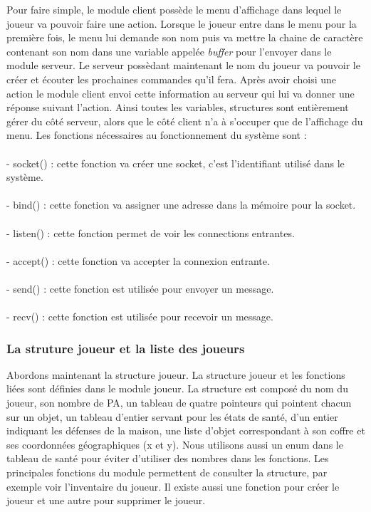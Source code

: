 \documentclass[a4paper,11pt]{article}
\begin{document}
Pour faire simple, le module client possède le menu d'affichage dans lequel le joueur va pouvoir faire une action. Lorsque le joueur entre dans le menu pour la première fois, le menu lui demande son nom puis va mettre la chaine de caractère contenant son nom dans une variable appelée \textit{buffer} pour l'envoyer dans le module serveur. Le serveur possèdant maintenant le nom du joueur va pouvoir le créer et écouter les prochaines commandes qu'il fera. Après avoir choisi une action le module client envoi cette information au serveur qui lui va donner une réponse suivant l'action. Ainsi toutes les variables, structures sont entièrement gérer du côté serveur, alors que le côté client n'a à s'occuper que de l'affichage du menu. Les fonctions nécessaires au fonctionnement du système sont :
\\
\\
- socket() : cette fonction va créer une socket, c'est l'identifiant utilisé dans le système.
\\
\\
- bind() : cette fonction va assigner une adresse dans la mémoire pour la socket.
\\
\\
- listen() : cette fonction permet de voir les connections entrantes.
\\
\\
- accept() : cette fonction va accepter la connexion entrante.
\\
\\
- send() : cette fonction est utilisée pour envoyer un message.
\\
\\
- recv() : cette fonction est utilisée pour recevoir un message.

\subsubsection{La struture joueur et la liste des joueurs}

Abordons maintenant la structure joueur. La structure joueur et les fonctions liées sont définies dans le module joueur. La structure est composé du nom du joueur, son nombre de PA, un tableau de quatre pointeurs qui pointent chacun sur un objet, un tableau d'entier servant pour les états de santé, d'un entier indiquant les défenses de la maison, une liste d'objet correspondant à son coffre et ses coordonnées géographiques (x et y). Nous utilisons aussi un enum dans le tableau de santé pour éviter d'utiliser des nombres dans les fonctions. Les principales fonctions du module permettent de consulter la structure, par exemple voir l'inventaire du joueur. Il existe aussi une fonction pour créer le joueur et une autre pour supprimer le joueur.
\\
\end{document}
